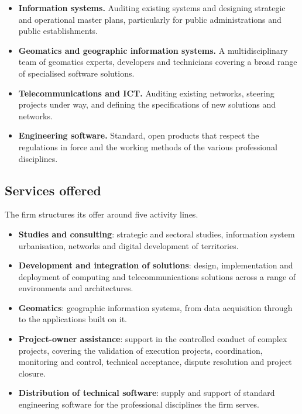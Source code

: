 \begin{itemize}
  \item \textbf{Information systems.} Auditing existing systems and designing strategic and
        operational master plans, particularly for public administrations and public
        establishments.
  \item \textbf{Geomatics and geographic information systems.} A multidisciplinary team of
        geomatics experts, developers and technicians covering a broad range of specialised
        software solutions.
  \item \textbf{Telecommunications and ICT.} Auditing existing networks, steering projects under
        way, and defining the specifications of new solutions and networks.
  \item \textbf{Engineering software.} Standard, open products that respect the regulations in
        force and the working methods of the various professional disciplines.
\end{itemize}

\subsection{Services offered}
The firm structures its offer around five activity lines.

\begin{itemize}
  \item \textbf{Studies and consulting}: strategic and sectoral studies, information system
        urbanisation, networks and digital development of territories.
  \item \textbf{Development and integration of solutions}: design, implementation and deployment of
        computing and telecommunications solutions across a range of environments and
        architectures.
  \item \textbf{Geomatics}: geographic information systems, from data acquisition through to the
        applications built on it.
  \item \textbf{Project-owner assistance}: support in the controlled conduct of complex projects,
        covering the validation of execution projects, coordination, monitoring and control,
        technical acceptance, dispute resolution and project closure.
  \item \textbf{Distribution of technical software}: supply and support of standard engineering
        software for the professional disciplines the firm serves.
\end{itemize}

